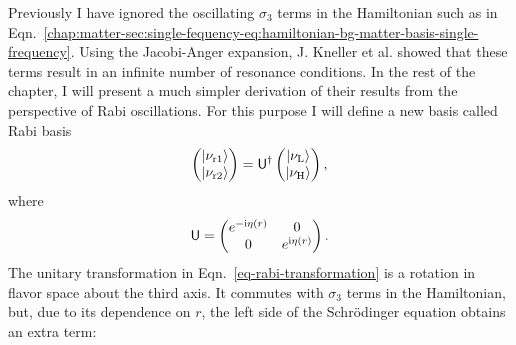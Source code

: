Previously I have ignored the oscillating $\sigma_3$ terms in the Hamiltonian such as in Eqn.~\eqref{chap:matter-sec:single-fequency-eq:hamiltonian-bg-matter-basis-single-frequency}. Using the Jacobi-Anger expansion, J. Kneller et al. showed that these terms result in an infinite number of resonance conditions. In the rest of the chapter, I will present a much simpler derivation of their results from the perspective of Rabi oscillations. For this purpose I will define a new basis called Rabi basis
\begin{equation}
\begin{pmatrix} \ket{\nu_{\mathrm{r1}}}\\ \ket{\nu_{\mathrm{r2}}} \end{pmatrix} =  \mathsf{U}^\dagger \begin{pmatrix} \ket{\nu_{\mathrm{L}}} \\ \ket{\nu_{\mathrm{H}}} \end{pmatrix},
\label{eq-rabi-basis}
\end{equation}
where
\begin{equation}
\mathsf{U} =  \begin{pmatrix} e^{-\ri \eta (r)} & 0 \\  0 & e^{\mathrm i \eta (r)}  \end{pmatrix}.
\label{eq-rabi-transformation}
\end{equation}
The unitary transformation in Eqn.~\eqref{eq-rabi-transformation} is a rotation in flavor space about the third axis.
It commutes with $\sigma_3$ terms in the Hamiltonian, but, due to its dependence on $r$, the left side of the Schr\"{o}dinger equation obtains an extra term:
